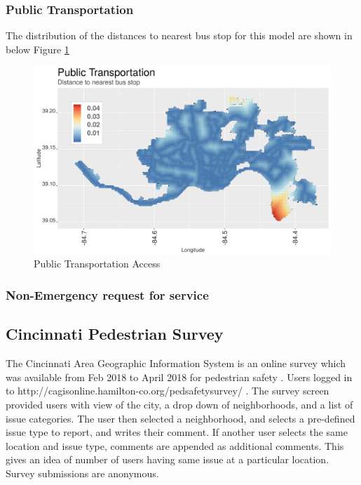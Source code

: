 \documentclass{llncs}
\begin{document}

\subsubsection{Public Transportation}

The distribution of the distances to nearest bus stop for this model are shown in below Figure \ref{figure : busStopDistances}

\FloatBarrier
\begin{figure}
 	\includegraphics[width=\textwidth, height=\textheight, keepaspectratio]{busStopDistances}
 	\caption{Public Transportation Access}
	\label{figure : busStopDistances}
\end{figure}
\FloatBarrier


\subsubsection{Non-Emergency request for service}


\subsection{Cincinnati Pedestrian Survey}

The Cincinnati Area Geographic Information System is an online survey which was available from Feb 2018 to April 2018 for pedestrian safety \cite{cvg2018city}. Users logged in to http://cagisonline.hamilton-co.org/pedsafetysurvey/ . The survey screen provided users with view of the city, a drop down of neighborhoods, and a list of issue categories. The user then selected a neighborhood, and selects a pre-defined issue type to report, and writes their comment. If another user selects the same location and issue type, comments are appended as additional comments. This gives an idea of number of users having same issue at a particular location. Survey submissions are anonymous.
\end{document}
